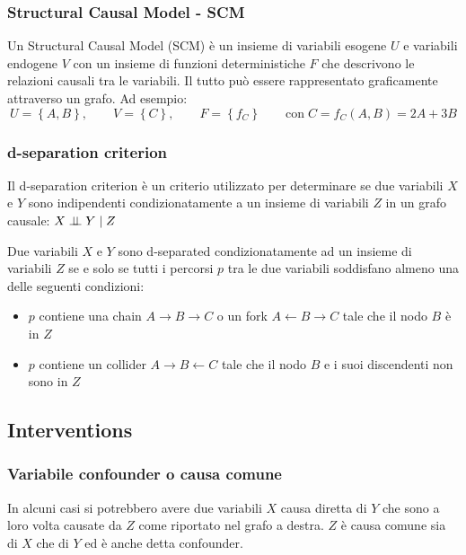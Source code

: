 \subsubsection*{Structural Causal Model - SCM}
Un Structural Causal Model (SCM) è un insieme di variabili esogene \(U\) e variabili endogene \(V\) con un insieme di funzioni
deterministiche \(F\) che descrivono le relazioni causali tra le variabili. Il tutto può essere rappresentato graficamente
attraverso un grafo. Ad esempio:
\[U = \left\{ A, B \right\}, \qquad V = \left\{ C \right\}, \qquad F = \left\{ f_C \right\}\qquad \text{con} \; C = f_C(A,B) = 2A + 3B\]

\subsubsection*{d-separation criterion}
Il d-separation criterion è un criterio utilizzato per determinare se due variabili \(X\) e \(Y\) sono indipendenti
condizionatamente a un insieme di variabili \(Z\) in un grafo causale: \(X \perp \!\!\! \perp Y \mid Z\)

Due variabili \(X\) e \(Y\) sono d-separated condizionatamente ad un insieme di variabili \(Z\) se e solo se tutti i percorsi \(p\)
tra le due variabili soddisfano almeno una delle seguenti condizioni:
\begin{itemize}
	\item \(p\) contiene una chain \(A \to B \to C\) o un fork \(A \leftarrow B \to C\) tale che il nodo \(B\) è in \(Z\)
	\item \(p\) contiene un collider \(A \to B \leftarrow C\) tale che il nodo \(B\) e i suoi discendenti non sono in \(Z\)
\end{itemize}

\newpage

\subsection{Interventions}
\subsubsection*{Variabile confounder o causa comune}
\begin{center}
	\begin{minipage}{0.68\textwidth}
		In alcuni casi si potrebbero avere due variabili \(X\) causa diretta di \(Y\) che sono a loro volta causate da \(Z\)
		come riportato nel grafo a destra. \(Z\) è causa comune sia di \(X\) che di \(Y\) ed è anche detta confounder.
	\end{minipage}
	\begin{minipage}{0.3\textwidth}
		\centering
	\end{minipage}
\end{center}

